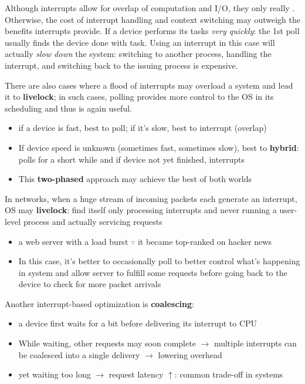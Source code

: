 \begin{tcolorbox}[left=0mm, top=1mm, right=0mm, rightlower=0mm, bottom=1mm,
  title= Interrupts \mr{NOT always} better than polling,
  halign title=center]
  Although interrupts allow for overlap of computation and I/O, they only
  really . Otherwise, the cost of interrupt handling and context switching may outweigh the benefits interrupts provide.  If a device performs its tasks \emph{very quickly}: the 1st poll usually finds the device done with task. Using an interrupt in this case will actually \emph{slow down} the system: switching to another process, handling the interrupt, and switching back to the issuing process is expensive.

  There are also cases where a flood of interrupts may overload a system and lead it to \textbf{livelock}; in such cases, polling provides more control to the OS in its scheduling and thus is again useful.
\end{tcolorbox}
\begin{itemize}
\item if a device is fast, best to poll; if it's slow, best to interrupt (overlap)
\item If device speed is unknown (sometimes fast, sometimes slow), best to \textbf{hybrid}: polls for a short while and if device not yet finished, interrupts
\item This \textbf{two-phased} approach may achieve the best of both worlds
\end{itemize}
In networks, when a huge stream of incoming packets each generate an interrupt, OS may \textbf{livelock}: find itself only processing interrupts and never running a user-level process and actually servicing requests
\begin{itemize}
\item a web server with a load burst $\because$ it became top-ranked on hacker news
\item In this case, it's better to occasionally poll to better control what's happening in system and allow server to fulfill some requests before going back to the device to check for more packet arrivals
\end{itemize}
Another interrupt-based optimization is \textbf{coalescing}:
\begin{itemize}
\item a device first waits for a bit before delivering its interrupt to CPU
\item While waiting, other requests may soon complete $\to$ multiple interrupts can be coalesced into a single delivery $\to$ lowering overhead
\item yet waiting too long $\to$ request latency $\uparrow$: common trade-off in systems
\end{itemize}
